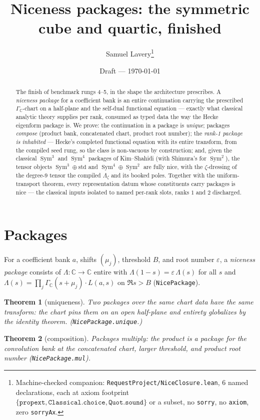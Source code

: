 \documentclass[11pt]{article}
\title{Niceness packages: the symmetric cube and quartic, finished}
\author{Samuel Lavery\thanks{Machine-checked companion:
\texttt{RequestProject/NiceClosure.lean}, 6 named declarations, each at axiom footprint
$\{\texttt{propext},\texttt{Classical.choice},\texttt{Quot.sound}\}$ or a subset,
no \texttt{sorry}, no \texttt{axiom}, zero \texttt{sorryAx}.}}
\date{Draft --- \today}
\newtheorem{theorem}{Theorem}
\newcommand{\Sym}{\operatorname{Sym}}
\newcommand{\Gm}{\Gamma_{\mathbb C}}
\begin{document}
\maketitle

\begin{abstract}
The finish of benchmark rungs 4--5, in the shape the architecture prescribes.  A
\emph{niceness package} for a coefficient bank is an entire continuation carrying the
prescribed $\Gm$-chart on a half-plane and the self-dual functional equation --- exactly
what classical analytic theory supplies per rank, consumed as typed data the way the
Hecke eigenform package is.  We prove: the continuation in a package is \emph{unique};
packages \emph{compose} (product bank, concatenated chart, product root number); the
\emph{rank-1 package is inhabited} --- Hecke's completed functional equation with its
entire transform, from the compiled seed rung, so the class is non-vacuous by
construction; and, given the classical $\Sym^3$ and $\Sym^4$ packages of
Kim--Shahidi (with Shimura's for $\Sym^2$), the tensor objects
$\Sym^3\!\oplus\mathrm{std}$ and $\Sym^4\!\oplus\Sym^2$ are fully nice, with the
$\zeta$-dressing of the degree-9 tensor the compiled $\Lambda_\zeta$ and its booked
poles.  Together with the uniform-transport theorem, every representation datum whose
constituents carry packages is nice --- the classical inputs isolated to named per-rank
slots, ranks $1$ and $2$ discharged.
\end{abstract}

\section{Packages}

For a coefficient bank $a$, shifts $(\mu_j)$, threshold $B$, and root number
$\varepsilon$, a \emph{niceness package} consists of $\Lambda\colon\mathbb C\to\mathbb C$
entire with $\Lambda(1-s)=\varepsilon\,\Lambda(s)$ for all $s$ and
$\Lambda(s)=\prod_j\Gm(s+\mu_j)\cdot L(a,s)$ on $\Re s>B$ (\texttt{NicePackage}).

\begin{theorem}[uniqueness]
Two packages over the same chart data have the same transform: the chart pins them on an
open half-plane and entirety globalizes by the identity theorem.
(\texttt{NicePackage.unique}.)
\end{theorem}

\begin{theorem}[composition]
Packages multiply: the product is a package for the convolution bank at the concatenated
chart, larger threshold, and product root number (\texttt{NicePackage.mul}).
\end{theorem}
\end{document}
